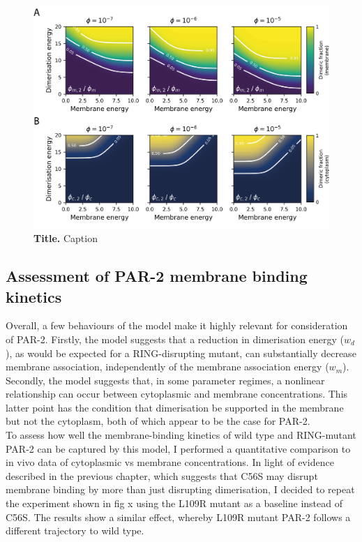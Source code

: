 \documentclass[12pt]{"article"}
\newcommand{\mycaption}[2]{\caption[#1]{\textbf{#1.} #2}}
\begin{document}
\begin{figure}[!h]
\includegraphics[scale=0.9]{thermodynamic_model_dimer_fractions}
\setlength{\abovecaptionskip}{20pt}
\centering
\mycaption{Title}{Caption}
\label{fig:thermodynamic_model_dimer_fractions}
\end{figure}


\clearpage
\subsection{Assessment of PAR-2 membrane binding kinetics}

Overall, a few behaviours of the model make it highly relevant for consideration of PAR-2. Firstly, the model suggests that a reduction in dimerisation energy ($w_d$), as would be expected for a RING-disrupting mutant, can substantially decrease membrane association, independently of the membrane association energy ($w_m$). Secondly, the model suggests that, in some parameter regimes, a nonlinear relationship can occur between cytoplasmic and membrane concentrations. This latter point has the condition that dimerisation be supported in the membrane but not the cytoplasm, both of which appear to be the case for PAR-2.\\

To assess how well the membrane-binding kinetics of wild type and RING-mutant PAR-2 can be captured by this model, I performed a quantitative comparison to in vivo data of cytoplasmic vs membrane concentrations. In light of evidence described in the previous chapter, which suggests that C56S may disrupt membrane binding by more than just disrupting dimerisation, I decided to repeat the experiment shown in fig x using the L109R mutant as a baseline instead of C56S. The results show a similar effect, whereby L109R mutant PAR-2 follows a different trajectory to wild type.\\
\end{document}
